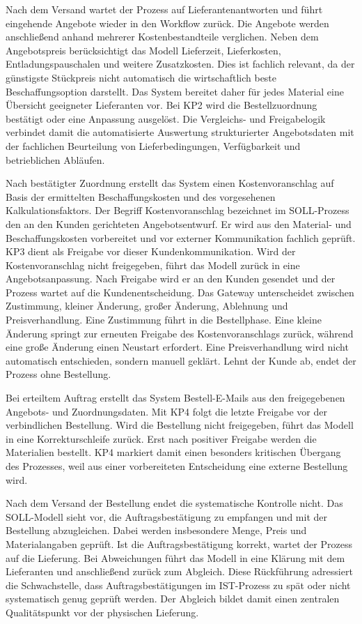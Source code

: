 \documentclass[a4paper,12pt]{article}
\begin{document}
Nach dem Versand wartet der Prozess auf Lieferantenantworten und führt eingehende Angebote wieder in den Workflow zurück. Die Angebote werden anschließend anhand mehrerer Kostenbestandteile verglichen. Neben dem Angebotspreis berücksichtigt das Modell Lieferzeit, Lieferkosten, Entladungspauschalen und weitere Zusatzkosten. Dies ist fachlich relevant, da der günstigste Stückpreis nicht automatisch die wirtschaftlich beste Beschaffungsoption darstellt. Das System bereitet daher für jedes Material eine Übersicht geeigneter Lieferanten vor. Bei KP2 wird die Bestellzuordnung bestätigt oder eine Anpassung ausgelöst. Die Vergleichs- und Freigabelogik verbindet damit die automatisierte Auswertung strukturierter Angebotsdaten mit der fachlichen Beurteilung von Lieferbedingungen, Verfügbarkeit und betrieblichen Abläufen.

Nach bestätigter Zuordnung erstellt das System einen Kostenvoranschlag auf Basis der ermittelten Beschaffungskosten und des vorgesehenen Kalkulationsfaktors. Der Begriff Kostenvoranschlag bezeichnet im SOLL-Prozess den an den Kunden gerichteten Angebotsentwurf. Er wird aus den Material- und Beschaffungskosten vorbereitet und vor externer Kommunikation fachlich geprüft. KP3 dient als Freigabe vor dieser Kundenkommunikation. Wird der Kostenvoranschlag nicht freigegeben, führt das Modell zurück in eine Angebotsanpassung. Nach Freigabe wird er an den Kunden gesendet und der Prozess wartet auf die Kundenentscheidung. Das Gateway unterscheidet zwischen Zustimmung, kleiner Änderung, großer Änderung, Ablehnung und Preisverhandlung. Eine Zustimmung führt in die Bestellphase. Eine kleine Änderung springt zur erneuten Freigabe des Kostenvoranschlags zurück, während eine große Änderung einen Neustart erfordert. Eine Preisverhandlung wird nicht automatisch entschieden, sondern manuell geklärt. Lehnt der Kunde ab, endet der Prozess ohne Bestellung.

Bei erteiltem Auftrag erstellt das System Bestell-E-Mails aus den freigegebenen Angebots- und Zuordnungsdaten. Mit KP4 folgt die letzte Freigabe vor der verbindlichen Bestellung. Wird die Bestellung nicht freigegeben, führt das Modell in eine Korrekturschleife zurück. Erst nach positiver Freigabe werden die Materialien bestellt. KP4 markiert damit einen besonders kritischen Übergang des Prozesses, weil aus einer vorbereiteten Entscheidung eine externe Bestellung wird.

Nach dem Versand der Bestellung endet die systematische Kontrolle nicht. Das SOLL-Modell sieht vor, die Auftragsbestätigung zu empfangen und mit der Bestellung abzugleichen. Dabei werden insbesondere Menge, Preis und Materialangaben geprüft. Ist die Auftragsbestätigung korrekt, wartet der Prozess auf die Lieferung. Bei Abweichungen führt das Modell in eine Klärung mit dem Lieferanten und anschließend zurück zum Abgleich. Diese Rückführung adressiert die Schwachstelle, dass Auftragsbestätigungen im IST-Prozess zu spät oder nicht systematisch genug geprüft werden. Der Abgleich bildet damit einen zentralen Qualitätspunkt vor der physischen Lieferung.
\end{document}
